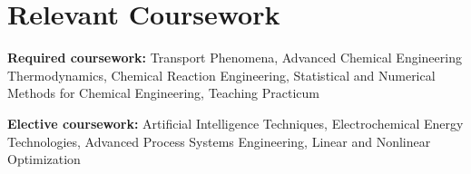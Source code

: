 \documentclass[letterpaper,11pt]{article}
\newcommand{\resumeSubHeadingListStart}{\begin{itemize}[leftmargin=0.15in, label={}]}
\newcommand{\resumeSubHeadingListEnd}{\end{itemize}}
\begin{document}

\section{Relevant Coursework}
\vspace{2pt}
\resumeSubHeadingListStart
  \small{\item{
      \textbf{Required coursework:}{ Transport Phenomena, Advanced Chemical Engineering Thermodynamics, Chemical Reaction Engineering, Statistical and Numerical Methods for Chemical Engineering, Teaching Practicum} \\ \vspace{3pt}
      
      \textbf{Elective coursework:}{ Artificial Intelligence Techniques, Electrochemical Energy Technologies, Advanced Process Systems Engineering, Linear and Nonlinear Optimization}
  }}
\resumeSubHeadingListEnd














\end{document}
